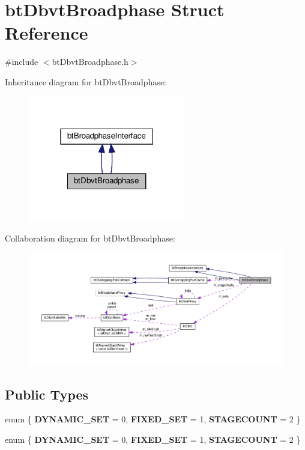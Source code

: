 \hypertarget{structbtDbvtBroadphase}{}\section{bt\+Dbvt\+Broadphase Struct Reference}
\label{structbtDbvtBroadphase}


{\ttfamily \#include $<$bt\+Dbvt\+Broadphase.\+h$>$}



Inheritance diagram for bt\+Dbvt\+Broadphase\+:
\nopagebreak
\begin{figure}[H]
\begin{center}
\leavevmode
\includegraphics[width=195pt]{structbtDbvtBroadphase__inherit__graph}
\end{center}
\end{figure}


Collaboration diagram for bt\+Dbvt\+Broadphase\+:
\nopagebreak
\begin{figure}[H]
\begin{center}
\leavevmode
\includegraphics[width=350pt]{structbtDbvtBroadphase__coll__graph}
\end{center}
\end{figure}
\subsection*{Public Types}
\begin{DoxyCompactItemize}
\item 
\mbox{\label{structbtDbvtBroadphase_a41c29c6de6ee52ff4bd9f9e5682c6bca}} 
enum \{ {\bfseries D\+Y\+N\+A\+M\+I\+C\+\_\+\+S\+ET} = 0, 
{\bfseries F\+I\+X\+E\+D\+\_\+\+S\+ET} = 1, 
{\bfseries S\+T\+A\+G\+E\+C\+O\+U\+NT} = 2
 \}
\item 
\mbox{\label{structbtDbvtBroadphase_a1f1930761b71a5938a2a334eb88068c8}} 
enum \{ {\bfseries D\+Y\+N\+A\+M\+I\+C\+\_\+\+S\+ET} = 0, 
{\bfseries F\+I\+X\+E\+D\+\_\+\+S\+ET} = 1, 
{\bfseries S\+T\+A\+G\+E\+C\+O\+U\+NT} = 2
 \}
\end{DoxyCompactItemize}
